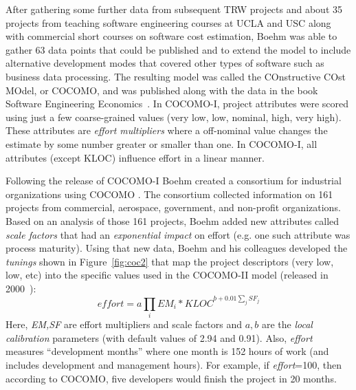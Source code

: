 \documentclass{sig-alternate}
\newcommand{\fig}[1]{Figure~\ref{fig:#1}}
\begin{document}


After  gathering some further data from subsequent
TRW projects and about 35 projects from teaching
software engineering courses at UCLA and USC along
with commercial short courses on software cost
estimation, Boehm was able to gather 63 data points
that could be published and to extend the model to
include alternative development modes that covered
other types of software such as business data
processing.  The resulting model was called the
COnstructive COst MOdel, or COCOMO, and was
published along with the data in the book Software
Engineering Economics~\cite{boehm81}. 
In COCOMO-I, project attributes
were scored using just a few coarse-grained values (very low,
low, nominal, high, very high). These attributes
are {\em effort multipliers} where
a off-nominal value changes the estimate by some number
greater or smaller than one.
In COCOMO-I, all attributes (except KLOC)
influence effort in a linear manner.

Following the release of COCOMO-I Boehm created a consortium for
industrial organizations using COCOMO .
The consortium
collected information on 161 projects from commercial,
aerospace, government, and non-profit organizations.
Based on an analysis of those 161 projects, Boehm
 added  new attributes called {\em scale factors}
that had an {\em exponential impact}
on effort (e.g. one such attribute was process maturity).
Using that new data, Boehm and his colleagues developed
the  {\em tunings} shown in \fig{coc2} that
map the project descriptors (very low, low, etc)
into the specific values used in the COCOMO-II model
(released in 2000~\cite{boehm00b}):
\begin{equation}\label{eq:cocII}
\mathit{effort}=a\prod_i EM_i *\mathit{KLOC}^{b+0.01\sum_j SF_j}
\end{equation}
Here, {\em EM,SF} are  effort multipliers and scale
factors and
 $a,b$ are the {\em local calibration} parameters (with default values of 2.94 and 0.91).
Also, {\em effort}
measures ``development months'' where one month
is 152 hours of work  (and includes development and management hours).
For example, if {\em effort}=100, then according to COCOMO,
five developers would finish
the project in 20 months.
\end{document}
